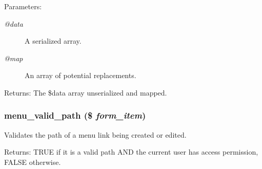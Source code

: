 \begin{Desc}
\item[Parameters:]
\begin{description}
\item[{\em @data}]A serialized array. \item[{\em @map}]An array of potential replacements. \end{description}
\end{Desc}
\begin{Desc}
\item[Returns:]The \$data array unserialized and mapped. \end{Desc}
\hypertarget{group__menu_g69ff205e60d5766a074c254060e07456}{
\subsubsection[{menu\_\-valid\_\-path}]{\setlength{\rightskip}{0pt plus 5cm}menu\_\-valid\_\-path (\$ {\em form\_\-item})}}
\label{group__menu_g69ff205e60d5766a074c254060e07456}


Validates the path of a menu link being created or edited.

\begin{Desc}
\item[Returns:]TRUE if it is a valid path AND the current user has access permission, FALSE otherwise. \end{Desc}

